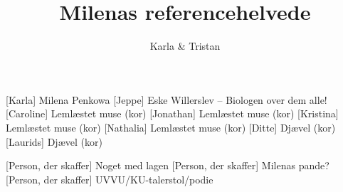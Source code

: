 \documentclass[a4paper,11pt]{article}
\title{Milenas referencehelvede}
\author{Karla \& Tristan}
\begin{document}
\maketitle

\begin{roles}
    [Karla] Milena Penkowa
    [Jeppe] Eske Willerslev -- Biologen over dem alle!
    [Caroline] Lemlæstet muse (kor)
    [Jonathan] Lemlæstet muse (kor)
    [Kristina] Lemlæstet muse (kor)
    [Nathalia] Lemlæstet muse (kor)
    [Ditte] Djævel (kor)
    [Laurids] Djævel (kor)
\end{roles}

\begin{props}
    [Person, der skaffer] Noget med lagen
    [Person, der skaffer] Milenas pande?
    [Person, der skaffer] UVVU/KU-talerstol/podie
\end{props}
\end{document}
